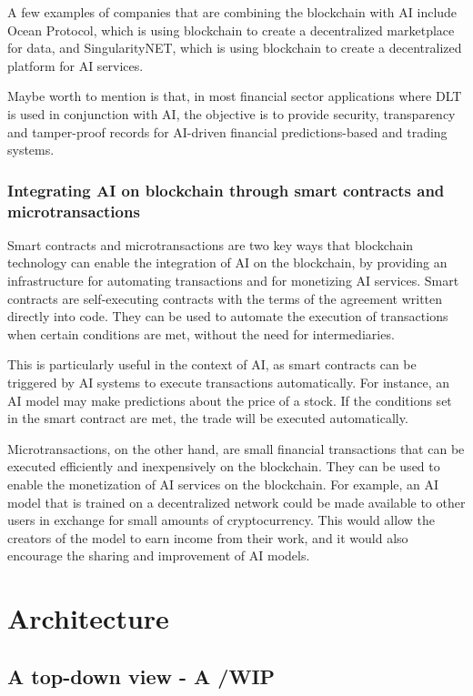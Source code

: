 \documentclass{article}
\begin{document}
A few examples of companies that are combining the blockchain with AI include Ocean Protocol\cite{oceanprotocol}, which is using blockchain to create a decentralized marketplace for data, and SingularityNET\cite{singularitynet}, which is using blockchain to create a decentralized platform for AI services.

Maybe worth to mention is that, in most financial sector applications where DLT is used in conjunction with AI, the objective is to provide security, transparency and tamper-proof records for AI-driven financial predictions-based and trading systems.

\subsubsection{Integrating AI on blockchain through smart contracts and microtransactions}
Smart contracts and microtransactions are two key ways that blockchain technology can enable the integration of AI on the blockchain, by providing an infrastructure for automating transactions and for monetizing AI services.
Smart contracts are self-executing contracts with the terms of the agreement written directly into code. 
They can be used to automate the execution of transactions when certain conditions are met, without the need for intermediaries.

This is particularly useful in the context of AI, as smart contracts can be triggered by AI systems to execute transactions automatically. 
For instance, an AI model may make predictions about the price of a stock. If the conditions set in the smart contract are met, the trade will be executed automatically.

Microtransactions, on the other hand, are small financial transactions that can be executed efficiently and inexpensively on the blockchain. They can be used to enable the monetization of AI services on the blockchain. For example, an AI model that is trained on a decentralized network could be made available to other users in exchange for small amounts of cryptocurrency. This would allow the creators of the model to earn income from their work, and it would also encourage the sharing and improvement of AI models.

\section{Architecture}
\subsection{A top-down view - A /WIP}
\end{document}
